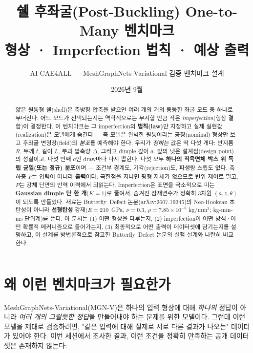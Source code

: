 \documentclass[11pt]{article}
\title{\textbf{쉘 후좌굴(Post-Buckling) One-to-Many 벤치마크\\
형상 · Imperfection 법칙 · 예상 출력}}
\author{AI-CAE4ALL --- MeshGraphNets-Variational 검증 벤치마크 설계}
\date{2026년 9월}
\begin{document}
\maketitle

\begin{abstract}
\noindent
얇은 원통형 쉘(shell)은 축방향 압축을 받으면 여러 개의 거의 동등한 좌굴 모드 중
하나로 무너진다. 어느 모드가 선택되는지는 역학적으로는 무시할 만큼 작은
\emph{imperfection}(형상 결함)이 결정한다. 이 벤치마크는 그 imperfection의
\textbf{법칙(law)}만 지정하고 실제 실현값(realization)은 모델에게 숨긴다 --- 즉
모델은 완벽한 원통이라는 공칭(nominal) 형상만 보고 후좌굴 변형장(field)의
\emph{분포}를 예측해야 한다. 우리가 \emph{정하는} 값은 딱 다섯 개다: 반지름
$R$, 두께 $t$, 길이 $L$, 부과 압축량 $\Delta$, 그리고 dimple 깊이 $a$. 앞의
넷은 설계점(design point)의 성질이고, 다섯 번째 $a$만 draw마다 다시 뽑힌다.
다섯 모두 \textbf{하나의 직육면체 박스 위 독립 균일(또는 정규) 분포}이며 ---
조건부 경계도, 기각(rejection)도, 파생량 스윕도 없다. 축하중 $P$는 입력이
아니라 \textbf{출력}이다: 극한점을 지나면 평형 자체가 없으므로 변위 제어로
밀고, $P$는 강체 단면의 반력 이력에서 되읽는다. Imperfection은 표면을 국소적으로
미는 \textbf{Gaussian dimple 단 한 개}($K{=}1$)로 줄여서, 숨겨진 잠재변수가
정확히 3차원 $(a, z, \theta)$이 되도록 만들었다. 재료는
Butterfly~Defect 논문(arXiv:2607.19245)의 Neo-Hookean 초탄성이 아니라
\textbf{선형탄성} 강재($E{=}210$~GPa, $\nu{=}0.3$, $\rho{=}7.85\times10^{-6}$
kg/mm$^3$; kg-mm-ms 단위계)를 쓴다. 이 문서는
(1) 어떤 형상을 다루는지, (2) imperfection이 어떤
방식·어떤 확률적 메커니즘으로 들어가는지, (3) 최종적으로 어떤 출력이
데이터셋에 담기는지를 설명하고, 이 설계를 방법론적으로 참고한
Butterfly~Defect 논문의 실험 설계와 나란히 비교한다.
\end{abstract}

\tableofcontents

\section{왜 이런 벤치마크가 필요한가}

MeshGraphNets-Variational(MGN-V)은 하나의 입력 형상에 대해 \emph{하나의}
정답이 아니라 \emph{여러 개의 그럴듯한 정답}을 만들어내야 하는 문제를 위한
모델이다. 그런데 이런 모델을 제대로 검증하려면, "같은 입력에 대해 실제로
서로 다른 결과가 나오는" 데이터가 있어야 한다. 이번 세션에서 조사한
결과, 이런 조건을 정확히 만족하는 공개 데이터셋은 존재하지 않는다:
\end{document}
